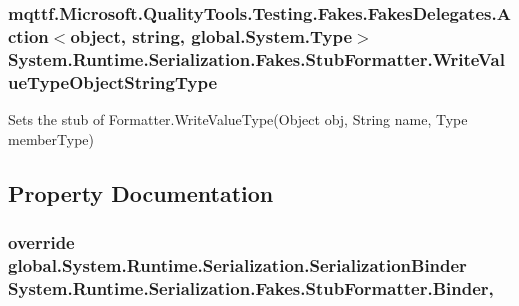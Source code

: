 \hypertarget{class_system_1_1_runtime_1_1_serialization_1_1_fakes_1_1_stub_formatter_a42df79e1f6427e5fe952d01b67e35b70}{
\subsubsection[{Write\-Value\-Type\-Object\-String\-Type}]{\setlength{\rightskip}{0pt plus 5cm}mqttf.\-Microsoft.\-Quality\-Tools.\-Testing.\-Fakes.\-Fakes\-Delegates.\-Action$<$object, string, global.\-System.\-Type$>$ System.\-Runtime.\-Serialization.\-Fakes.\-Stub\-Formatter.\-Write\-Value\-Type\-Object\-String\-Type}}\label{class_system_1_1_runtime_1_1_serialization_1_1_fakes_1_1_stub_formatter_a42df79e1f6427e5fe952d01b67e35b70}


Sets the stub of Formatter.\-Write\-Value\-Type(\-Object obj, String name, Type member\-Type)



\subsection{Property Documentation}
\hypertarget{class_system_1_1_runtime_1_1_serialization_1_1_fakes_1_1_stub_formatter_a52b8994ef0819dd2e8b00780a33034ff}{
\subsubsection[{Binder}]{\setlength{\rightskip}{0pt plus 5cm}override global.\-System.\-Runtime.\-Serialization.\-Serialization\-Binder System.\-Runtime.\-Serialization.\-Fakes.\-Stub\-Formatter.\-Binder\hspace{0.3cm}{\ttfamily [get]}, {\ttfamily [set]}}}\label{class_system_1_1_runtime_1_1_serialization_1_1_fakes_1_1_stub_formatter_a52b8994ef0819dd2e8b00780a33034ff}


